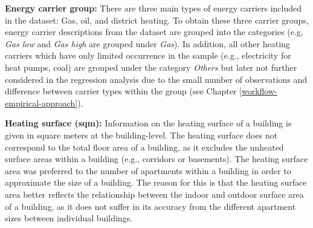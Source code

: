 \documentclass[12pt,twoside]{reedthesis}
\begin{document}
\textbf{Energy carrier group:} There are three main types of energy carriers included in the dataset: Gas, oil, and district heating. To obtain these three carrier groups, energy carrier descriptions from the dataset are grouped into the categories (e.g, \emph{Gas low} and \emph{Gas high} are grouped under \emph{Gas}). In addition, all other heating carriers which have only limited occurrence in the sample (e.g., electricity for heat pumps, coal) are grouped under the category \emph{Others} but later not further considered in the regression analysis due to the small number of observations and difference between carrier types within the group (see Chapter \ref{workflow-empirical-approach}).

\textbf{Heating surface (sqm):} Information on the heating surface of a building is given in square meters at the building-level. The heating surface does not correspond to the total floor area of a building, as it excludes the unheated surface areas within a building (e.g., corridors or basements). The heating surface area was preferred to the number of apartments within a building in order to approximate the size of a building. The reason for this is that the heating surface area better reflects the relationship between the indoor and outdoor surface area of a building, as it does not suffer in its accuracy from the different apartment sizes between individual buildings.
\end{document}
